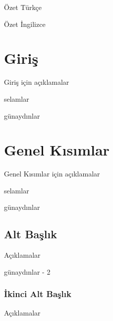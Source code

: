 \documentclass[12pt, oneside]{iusosbil}
\begin{document}
\begin{summary}[tr]
	Özet Türkçe
\end{summary}

\begin{summary}[en]
	Özet İngilizce 
\end{summary}

\startofthesis %
%
%
%
%
%

\section{Giriş}
	Giriş için açıklamalar

\begin{definition}
	selamlar
\end{definition}
	
\begin{definition}
	günaydınlar
\end{definition}

\section{Genel Kısımlar}
	Genel Kısımlar için açıklamalar
	
\begin{definition}
	selamlar
\end{definition}

\begin{definition}
	günaydınlar
\end{definition}
	
\subsection{Alt Başlık}
	Açıklamalar
	
\begin{definition}
	günaydınlar - 2
\end{definition}

\subsubsection{İkinci Alt Başlık}
	Açıklamalar
	
\end{document}
